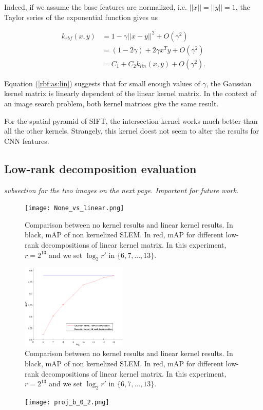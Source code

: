 \documentclass[10pt,twocolumn,letterpaper]{article}
\begin{document}
Indeed, if we assume the base features are normalized, i.e. $||x||=||y||=1$, the Taylor series of the exponential function gives us

\begin{align}
k_{rbf}(x,y) &= 1-\gamma||x-y||^2+O(\gamma^2)\\
&=(1-2\gamma)+2\gamma x^Ty+O(\gamma^2)\\
&=C_1+C_2k_{lin}(x,y)+O(\gamma^2).\label{rbf:as:lin}
\end{align}

Equation (\ref{rbf:as:lin}) suggests that for small enough values of $\gamma$, the Gaussian kernel matrix is linearly dependent of the linear kernel matrix. In the context of an image search problem, both kernel matrices give the same result.%


For the spatial pyramid of SIFT, the intersection kernel works much better than all the other kernels. Strangely, this kernel doest not seem to alter the results for CNN features.


\subsection{Low-rank decomposition evaluation}
\emph{\color{red}subsection for the two images on the next page. Important for future work.}
\begin{figure}[!h]
\centering
\texttt{[image: None\_vs\_linear.png]}
\caption{Comparison between no kernel results and linear kernel results. In black, mAP of non kernelized SLEM. In red, mAP for different low-rank decompositions of linear kernel matrix. In this experiment, $r=2^{13}$ and we set $\log_2 r'$ in $\{6, 7,...,13\}$. }
\label{no.ker.vs.linear1}
\end{figure}

\begin{figure}[!h]
\centering
\includegraphics[width=0.45\textwidth]{rbf_decomposition2.png}
\caption{Comparison between no kernel results and linear kernel results. In black, mAP of non kernelized SLEM. In red, mAP for different low-rank decompositions of linear kernel matrix. In this experiment, $r=2^{13}$ and we set $\log_2 r'$ in $\{6, 7,...,13\}$. }
\label{no.ker.vs.linear2}
\end{figure}

\begin{figure}[!h]
\centering
\texttt{[image: proj\_b\_0\_2.png]}
\caption{}
\label{proj}
\end{figure}
 

\end{document}
